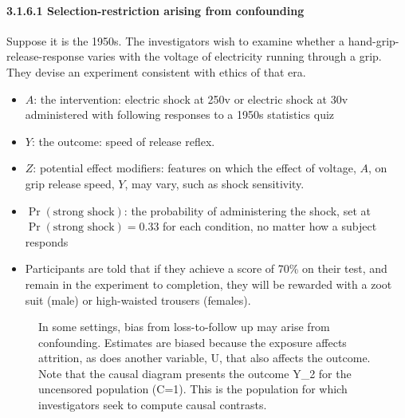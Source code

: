 \documentclass[
  singlecolumn]{article}
\let\oldparagraph\paragraph
\renewcommand{\paragraph}[1]{\oldparagraph{#1}\mbox{}}
\providecommand{\tightlist}{%
  \setlength{\itemsep}{0pt}\setlength{\parskip}{0pt}}\usepackage{longtable,booktabs,array}
\begin{document}
\paragraph{3.1.6.1 Selection-restriction arising from
confounding}\label{selection-restriction-arising-from-confounding}

Suppose it is the 1950s. The investigators wish to examine whether a
hand-grip-release-response varies with the voltage of electricity
running through a grip. They devise an experiment consistent with ethics
of that era.

\begin{itemize}
\tightlist
\item
  \(A\): the intervention: electric shock at 250v or electric shock at
  30v administered with following responses to a 1950s statistics quiz
\item
  \(Y\): the outcome: speed of release reflex.
\item
  \(Z\): potential effect modifiers: features on which the effect of
  voltage, \(A\), on grip release speed, \(Y\), may vary, such as shock
  sensitivity.
\item
  \(\Pr(\text{strong shock})\): the probability of administering the
  shock, set at \(\Pr(\text{strong shock})= 0.33\) for each condition,
  no matter how a subject responds
\item
  Participants are told that if they achieve a score of 70\% on their
  test, and remain in the experiment to completion, they will be
  rewarded with a zoot suit (male) or high-waisted trousers (females).
\end{itemize}

\begin{figure}


\caption{\label{fig-experiment-selection-collider-adjustment}In some
settings, bias from loss-to-follow up may arise from confounding.
Estimates are biased because the exposure affects attrition, as does
another variable, U, that also affects the outcome. Note that the causal
diagram presents the outcome Y\_2 for the uncensored population (C=1).
This is the population for which investigators seek to compute causal
contrasts.}

\end{figure}%
\end{document}
